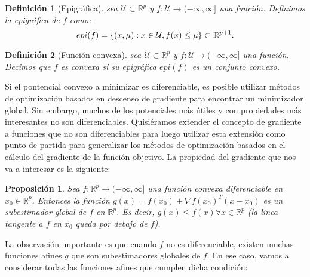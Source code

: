 \documentclass[12pt,draftcls, onecolumn, letterpaper,compsoc]{IEEEtran}
\newtheorem{definition}{\textbf{Definici\'{o}n}}
\newtheorem{proposition}{\textbf{Proposici\'{o}n}}
\begin{document}
\begin{definition}[Epigr\'{a}fica]
sea $\mathcal{U}\subset \mathbb{R}^{p}$ y $f:\mathcal{U} \rightarrow (-\infty, \infty]$ una funci\'{o}n. Definimos la {\it epigr\'{a}fica} de $f$ como:
    \begin{displaymath}
        epi(f) = \left\lbrace (x, \mu): x\in \mathcal{U}, f(x)\leq \mu \right\rbrace \subset \mathbb{R}^{p+1}.\\
    \end{displaymath}
\end{definition}

\begin{definition}[Funci\'{o}n convexa]
sea $\mathcal{U}\subset \mathbb{R}^{p}$ y $f:\mathcal{U} \rightarrow (-\infty, \infty]$ una funci\'{o}n. Decimos que $f$ es convexa si su epigr\'{a}fica $epi(f)$ es un conjunto convexo.\\
\end{definition}

Si el pontencial convexo a minimizar es diferenciable, es posible utilizar m\'{e}todos de optimizaci\'{o}n basados en descenso de gradiente para encontrar un minimizador global. Sin embargo, muchos de los potenciales m\'{a}s \'{u}tiles y con propiedades m\'{a}s interesantes no son diferenciables. Quisi\'{e}ramos extender el concepto de gradiente a funciones que no son diferenciables para luego utilizar esta extensi\'{o}n como punto de partida para generalizar los m\'{e}todos de optimizaci\'{o}n basados en el c\'{a}lculo del gradiente de la funci\'{o}n objetivo. La propiedad del gradiente que nos va a interesar es la siguiente:\\

\begin{proposition}
    Sea $f: \mathbb{R}^{p} \rightarrow (-\infty, \infty]$ una funci\'{o}n convexa diferenciable en $x_0 \in \mathbb{R}^{p}$. Entonces la funci\'{o}n $g(x)=f(x_0) + \nabla f(x_0)^{T}(x-x_0)$ es un subestimador global de $f$ en $\mathbb{R}^{p}$. Es decir, $g(x)\leq f(x) \forall x\in \mathbb{R}^{p}$ (la linea tangente a $f$ en $x_0$ queda por debajo de $f$).\\
\end{proposition}
La observaci\'{o}n importante es que cuando $f$ no es diferenciable, existen muchas funciones afines $g$ que son subestimadores globales de $f$. En ese caso, vamos a considerar todas las funciones afines que cumplen dicha condici\'{o}n:\\
\end{document}
